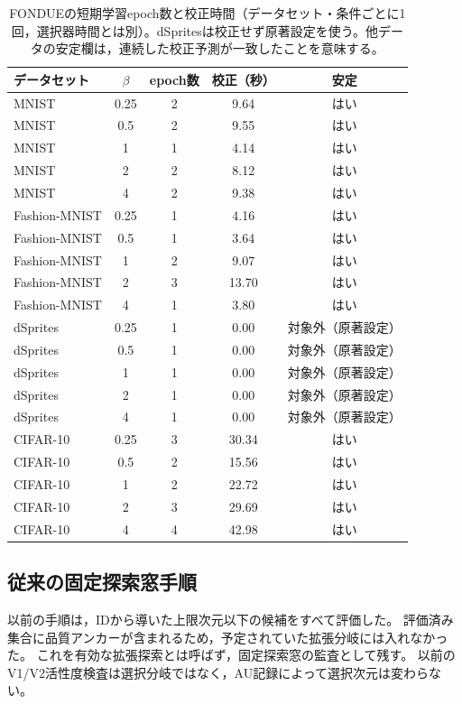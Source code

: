 \documentclass[11pt,a4paper]{ltjsarticle}
\begin{document}
\begin{table}[H]
\caption{FONDUEの短期学習epoch数と校正時間（データセット・条件ごとに1回，選択器時間とは別）。dSpritesは校正せず原著設定を使う。他データの安定欄は，連続した校正予測が一致したことを意味する。}\label{tab:epochs}
\small
\setlength{\tabcolsep}{3.5pt}
\begin{tabular*}{\textwidth}{@{\extracolsep{\fill}}lcccc@{}}
\toprule
データセット & $\beta$ & epoch数 & 校正（秒） & 安定 \\
\midrule
MNIST & 0.25 & 2 & 9.64 & はい \\
MNIST & 0.5 & 2 & 9.55 & はい \\
MNIST & 1 & 1 & 4.14 & はい \\
MNIST & 2 & 2 & 8.12 & はい \\
MNIST & 4 & 2 & 9.38 & はい \\
Fashion-MNIST & 0.25 & 1 & 4.16 & はい \\
Fashion-MNIST & 0.5 & 1 & 3.64 & はい \\
Fashion-MNIST & 1 & 2 & 9.07 & はい \\
Fashion-MNIST & 2 & 3 & 13.70 & はい \\
Fashion-MNIST & 4 & 1 & 3.80 & はい \\
dSprites & 0.25 & 1 & 0.00 & 対象外（原著設定） \\
dSprites & 0.5 & 1 & 0.00 & 対象外（原著設定） \\
dSprites & 1 & 1 & 0.00 & 対象外（原著設定） \\
dSprites & 2 & 1 & 0.00 & 対象外（原著設定） \\
dSprites & 4 & 1 & 0.00 & 対象外（原著設定） \\
CIFAR-10 & 0.25 & 3 & 30.34 & はい \\
CIFAR-10 & 0.5 & 2 & 15.56 & はい \\
CIFAR-10 & 1 & 2 & 22.72 & はい \\
CIFAR-10 & 2 & 3 & 29.69 & はい \\
CIFAR-10 & 4 & 4 & 42.98 & はい \\
\bottomrule
\end{tabular*}
\end{table}

\subsection{従来の固定探索窓手順}\label{app:legacy}
以前の手順は，IDから導いた上限次元以下の候補をすべて評価した。
評価済み集合に品質アンカーが含まれるため，予定されていた拡張分岐には入れなかった。
これを有効な拡張探索とは呼ばず，固定探索窓の監査として残す。
以前のV1/V2活性度検査は選択分岐ではなく，AU記録によって選択次元は変わらない。
\end{document}
